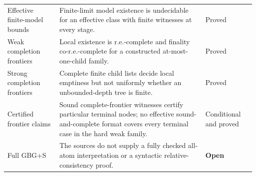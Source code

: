 \documentclass[11pt,letterpaper]{article}
\theoremstyle{definition}\newtheorem{definition}[theorem]{Definition}\newtheorem{example}[theorem]{Example}
\theoremstyle{remark}\newtheorem{remark}[theorem]{Remark}
\begin{document}
\begin{longtable}{@{}p{}p{}p{}@{}}
Effective finite-model bounds & Finite-limit model existence is undecidable for an effective class with finite witnesses at every stage. & Proved \\
Weak completion frontiers & Local existence is r.e.-complete and finality co-r.e.-complete for a constructed at-most-one-child family. & Proved \\
Strong completion frontiers & Complete finite child lists decide local emptiness but not uniformly whether an unbounded-depth tree is finite. & Proved \\
Certified frontier claims & Sound complete-frontier witnesses certify particular terminal nodes; no effective sound-and-complete format covers every terminal case in the hard weak family. & Conditional and proved \\
Full GBG+S & The sources do not supply a fully checked all-atom interpretation or a syntactic relative-consistency proof. & \textbf{Open} \\
\bottomrule
\end{longtable}
\end{document}
